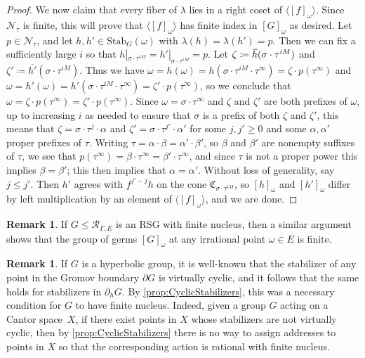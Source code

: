 \documentclass[11pt,letterpaper]{amsart}
\theoremstyle{definition}
\newtheorem{remark}[theorem]{Remark}
\newcommand{\R}{\mathcal{R}}
\newcommand{\Nuc}{\mathcal{N}}
\newcommand{\C}{\mathfrak{C}}
\newcommand{\Stab}{\mathrm{Stab}}
\newcommand{\oh}{\mkern 2mu\overline{\mkern-2mu h\mkern-0.25mu}\mkern 0.25mu}
\begin{document}
\begin{proof}
We now claim that every fiber of $\lambda$ lies in a right coset of $\langle [f]_\omega\rangle$. Since $\Nuc_\tau$ is finite, this will prove that $\langle [f]_\omega\rangle$ has finite index in $[G]_\omega$ as desired. Let $p\in\Nuc_\tau$, and let $h,h'\in \Stab_G(\omega)$ with $\lambda(h)=\lambda(h')=p$. Then we can fix a sufficiently large $i$ so that $h|_{\sigma\cdot\tau^{iM}}=h'|_{\sigma\cdot\tau^{iM}}=p$. Let $\zeta\coloneqq\oh(\sigma\cdot\tau^{iM})$ and $\zeta'\coloneqq\overline{h'}(\sigma\cdot\tau^{iM})$. Thus we have $\omega=h(\omega)=h(\sigma\cdot\tau^{iM}\cdot\tau^\infty)=\zeta\cdot p(\tau^\infty)$ and $\omega=h'(\omega)=h'(\sigma\cdot\tau^{iM}\cdot\tau^\infty)=\zeta'\cdot p(\tau^\infty)$, so we conclude that $\omega=\zeta\cdot p(\tau^\infty)=\zeta'\cdot p(\tau^\infty)$. Since $\omega=\sigma\cdot\tau^\infty$ and $\zeta$ and $\zeta'$ are both prefixes of $\omega$, up to increasing $i$ as needed to ensure that $\sigma$ is a prefix of both $\zeta$ and $\zeta'$, this means that $\zeta=\sigma\cdot\tau^j\cdot \alpha$ and $\zeta'=\sigma\cdot\tau^{j'}\cdot \alpha'$ for some $j,j'\ge 0$ and some $\alpha,\alpha'$ proper prefixes of $\tau$. Writing $\tau=\alpha\cdot\beta=\alpha'\cdot\beta'$, so $\beta$ and $\beta'$ are nonempty suffixes of $\tau$, we see that $p(\tau^\infty)=\beta\cdot\tau^\infty=\beta'\cdot\tau^\infty$, and since $\tau$ is not a proper power this implies $\beta=\beta'$; this then implies that $\alpha=\alpha'$. Without loss of generality, say $j\le j'$. Then $h'$ agrees with $f^{j'-j}h$ on the cone $\C_{\sigma\cdot\tau^{iM}}$, so $[h]_\omega$ and $[h']_\omega$ differ by left multiplication by an element of $\langle [f]_\omega \rangle$, and we are done.
\end{proof}


\begin{remark}
If $G\leq \R_{\Gamma,E}$ is an RSG with finite nucleus, then a similar argument shows that the group of germs $[G]_\omega$ at any irrational point $\omega\in E$ is finite.
\end{remark}

\begin{remark}
If $G$ is a hyperbolic group, it is well-known that the stabilizer of any point in the Gromov boundary $\partial G$ is virtually cyclic, and it follows that the same holds for stabilizers in $\partial_h G$. By \cref{prop:CyclicStabilizers}, this was a necessary condition for $G$ to have finite nucleus.  Indeed, given a group $G$ acting on a Cantor space~$X$, if there exist points in $X$ whose stabilizers are not virtually cyclic, then by \cref{prop:CyclicStabilizers} there is no way to assign addresses to points in $X$ so that the corresponding action is rational with finite nucleus.
\end{remark}
\end{document}
